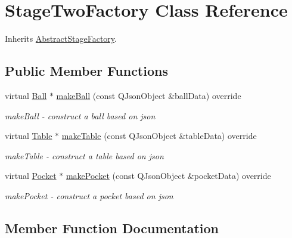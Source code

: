\hypertarget{class_stage_two_factory}{}\section{Stage\+Two\+Factory Class Reference}
\label{class_stage_two_factory}


Inherits \mbox{\hyperlink{class_abstract_stage_factory}{Abstract\+Stage\+Factory}}.

\subsection*{Public Member Functions}
\begin{DoxyCompactItemize}
\item 
virtual \mbox{\hyperlink{class_ball}{Ball}} $\ast$ \mbox{\hyperlink{class_stage_two_factory_aa12e02122eea28b08b3e148521bc2055}{make\+Ball}} (const Q\+Json\+Object \&ball\+Data) override
\begin{DoxyCompactList}\small\item\em make\+Ball -\/ construct a ball based on json \end{DoxyCompactList}\item 
virtual \mbox{\hyperlink{class_table}{Table}} $\ast$ \mbox{\hyperlink{class_stage_two_factory_aa532818e02bed0ea1f5c79a1a1487e71}{make\+Table}} (const Q\+Json\+Object \&table\+Data) override
\begin{DoxyCompactList}\small\item\em make\+Table -\/ construct a table based on json \end{DoxyCompactList}\item 
virtual \mbox{\hyperlink{class_pocket}{Pocket}} $\ast$ \mbox{\hyperlink{class_stage_two_factory_a6b66c413691103cf5df2840bcdb683ef}{make\+Pocket}} (const Q\+Json\+Object \&pocket\+Data) override
\begin{DoxyCompactList}\small\item\em make\+Pocket -\/ construct a pocket based on json \end{DoxyCompactList}\end{DoxyCompactItemize}


\subsection{Member Function Documentation}
\mbox{\label{class_stage_two_factory_aa12e02122eea28b08b3e148521bc2055}} 
